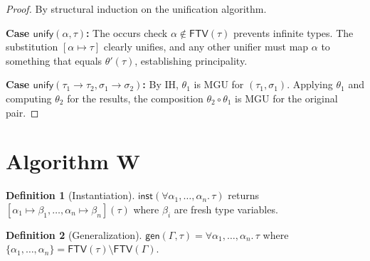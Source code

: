 \documentclass[11pt,twoside,openright]{book}
\theoremstyle{definition}
\newtheorem{definition}{Definition}[chapter]
\theoremstyle{plain}
\theoremstyle{remark}
\newcommand{\Subst}{\theta}                  %
\newcommand{\Unify}{\mathsf{unify}}          %
\newcommand{\Inst}{\mathsf{inst}}            %
\newcommand{\Gen}{\mathsf{gen}}              %
\newcommand{\FTV}{\mathsf{FTV}}              %
\begin{document}
\begin{proof}
By structural induction on the unification algorithm.

\textbf{Case $\Unify(\alpha, \tau)$:} The occurs check $\alpha \notin \FTV(\tau)$ prevents infinite types. The substitution $[\alpha \mapsto \tau]$ clearly unifies, and any other unifier must map $\alpha$ to something that equals $\Subst'(\tau)$, establishing principality.

\textbf{Case $\Unify(\tau_1 \to \tau_2, \sigma_1 \to \sigma_2)$:} By IH, $\Subst_1$ is MGU for $(\tau_1, \sigma_1)$. Applying $\Subst_1$ and computing $\Subst_2$ for the results, the composition $\Subst_2 \circ \Subst_1$ is MGU for the original pair.
\end{proof}

\section{Algorithm W}

\begin{definition}[Instantiation]
\label{def:instantiation}
$\Inst(\forall \alpha_1, \ldots, \alpha_n.\, \tau)$ returns $[\alpha_1 \mapsto \beta_1, \ldots, \alpha_n \mapsto \beta_n](\tau)$ where $\beta_i$ are fresh type variables.
\end{definition}

\begin{definition}[Generalization]
\label{def:generalization}
$\Gen(\Gamma, \tau) = \forall \alpha_1, \ldots, \alpha_n.\, \tau$ where $\{\alpha_1, \ldots, \alpha_n\} = \FTV(\tau) \setminus \FTV(\Gamma)$.
\end{definition}
\end{document}
